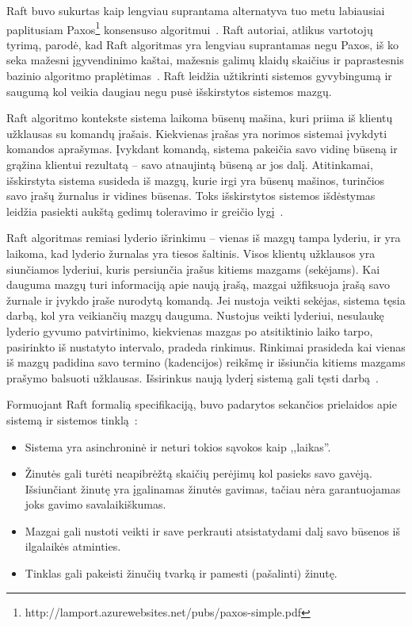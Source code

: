 \documentclass{VUMIFPSkursinis}
\begin{document}
Raft buvo sukurtas kaip lengviau suprantama alternatyva tuo metu labiausiai paplitusiam Paxos\footnote{http://lamport.azurewebsites.net/pubs/paxos-simple.pdf} konsensuso algoritmui~\cite{ongaro_consensus, diego_designing_2016}. Raft autoriai, atlikus vartotojų tyrimą, parodė, kad Raft algoritmas yra lengviau suprantamas negu Paxos, iš ko seka mažesni įgyvendinimo kaštai, mažesnis galimų klaidų skaičius ir paprastesnis bazinio algoritmo praplėtimas~\cite{ongaro_consensus}. Raft leidžia užtikrinti sistemos gyvybingumą ir saugumą kol veikia daugiau negu pusė išskirstytos sistemos mazgų. 

Raft algoritmo kontekste sistema laikoma būsenų mašina, kuri priima iš klientų užklausas su komandų įrašais. Kiekvienas įrašas yra norimos sistemai įvykdyti komandos aprašymas. Įvykdant komandą, sistema pakeičia savo vidinę būseną ir grąžina klientui rezultatą -- savo atnaujintą būseną ar jos dalį. Atitinkamai, išskirstyta sistema susideda iš mazgų, kurie irgi yra būsenų mašinos, turinčios savo įrašų žurnalus ir vidines būsenas. Toks išskirstytos sistemos išdėstymas leidžia pasiekti aukštą gedimų toleravimo ir greičio lygį~\cite{ongaro_consensus, steen_distributed_2017}.

Raft algoritmas remiasi lyderio išrinkimu -- vienas iš mazgų tampa lyderiu, ir yra laikoma, kad lyderio žurnalas yra tiesos šaltinis. Visos klientų užklausos yra siunčiamos lyderiui, kuris persiunčia įrašus kitiems mazgams (sekėjams). Kai dauguma mazgų turi informaciją apie naują įrašą, mazgai užfiksuoja įrašą savo žurnale ir įvykdo įraše nurodytą komandą. Jei nustoja veikti sekėjas, sistema tęsia darbą, kol yra veikiančių mazgų dauguma. Nustojus veikti lyderiui, nesulaukę lyderio gyvumo patvirtinimo, kiekvienas mazgas po atsitiktinio laiko tarpo, pasirinkto iš nustatyto intervalo, pradeda rinkimus. Rinkimai prasideda kai vienas iš mazgų padidina savo termino (kadencijos) reikšmę ir išsiunčia kitiems mazgams prašymo balsuoti užklausas. Išsirinkus naują lyderį sistemą gali tęsti darbą~\cite{ongaro_consensus}. 

Formuojant Raft formalią specifikaciją, buvo padarytos sekančios prielaidos apie sistemą ir sistemos tinklą~\cite{ongaro_consensus}:
\begin{itemize}
\item Sistema yra asinchroninė ir neturi tokios sąvokos kaip ,,laikas''.
\item Žinutės gali turėti neapibrėžtą skaičių perėjimų kol pasieks savo gavėją. Išsiunčiant žinutę yra įgalinamas žinutės gavimas, tačiau nėra garantuojamas joks gavimo savalaikiškumas.
\item Mazgai gali nustoti veikti ir save perkrauti atsistatydami dalį savo būsenos iš ilgalaikės atminties.
\item Tinklas gali pakeisti žinučių tvarką ir pamesti (pašalinti) žinutę. 
\end{itemize}
\end{document}
